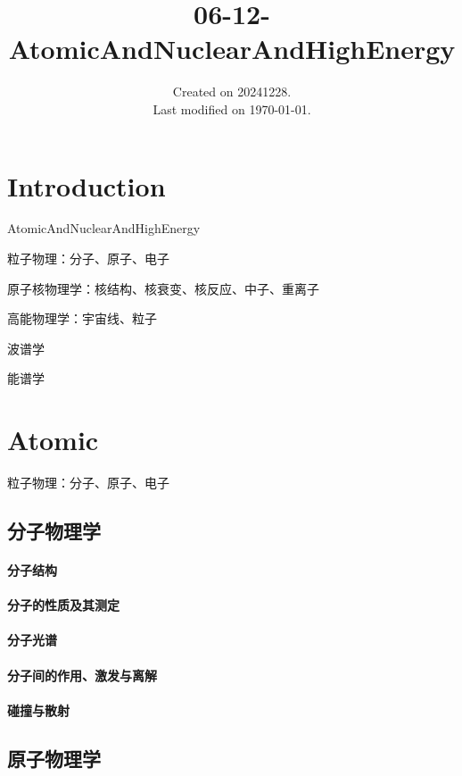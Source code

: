 \documentclass[UTF8]{../06-Physics}
\begin{document}
\title{06-12-AtomicAndNuclearAndHighEnergy}
\date{Created on 20241228.\\   Last modified on \today.}
\maketitle
\tableofcontents





\chapter{Introduction}



AtomicAndNuclearAndHighEnergy

粒子物理：分子、原子、电子

原子核物理学：核结构、核衰变、核反应、中子、重离子

高能物理学：宇宙线、粒子

波谱学

能谱学

\chapter{Atomic}
粒子物理：分子、原子、电子

\section{分子物理学}
    \subsubsection{分子结构}
    \subsubsection{分子的性质及其测定}
    \subsubsection{分子光谱}
    \subsubsection{分子间的作用、激发与离解}
    \subsubsection{碰撞与散射}
\section{原子物理学}
\end{document}
